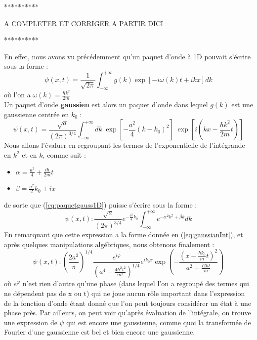 \documentclass{book}
\begin{document}
**********

A COMPLETER ET CORRIGER A PARTIR DICI

**********

En effet, nous avons vu précédemment qu'un paquet d'onde à 1D pouvait s'écrire sous la forme : 
\begin{equation}
  \psi(x,t) = \frac{1}{\sqrt{2 \pi}} \int_{- \infty}^{+ \infty} g(k) \exp \left[ -i\omega(k)t + ikx \right] dk
\end{equation}
où l'on a $\omega(k) = \frac{\hbar k^2}{2m}$ \\
Un paquet d'onde \textbf{gaussien} est alors un paquet d'onde dans lequel $g(k)$ est une gaussienne centrée en $k_0$ :
\begin{equation}
\psi(x, t) = \dfrac{\sqrt{a}}{\left(2\pi\right) ^{3/4}} \int_{-\infty} ^{+\infty} dk \; \exp \left[-\dfrac{a^2}{4} (k-k_0)^2\right] \; \exp\left[i \left(kx - \dfrac{\hbar k^2}{2m}t\right)\right]
\label{eq:paquetgauss1D}
\end{equation}
Nous allons l'évaluer en regroupant les termes de l'exponentielle de l'intégrande en $k^2$ et en $k$, comme suit : 
\begin{itemize}
  \item $\alpha = \frac{a^2}{4} + \frac{i\hbar}{2m}t$
  \item $\beta = \frac{a^2}{2}k_0 + ix$
\end{itemize}
de sorte que (\ref{eq:paquetgauss1D}) puisse s'écrire sous la forme : 
\begin{equation}
  \psi(x,t) : \frac{\sqrt{a}}{(2\pi)^{3/4}} e^{-\frac{a^2}{4}k_0} \int_{- \infty}^{+\infty} e^{-\alpha^2k^2 + \beta k} dk
\end{equation}
En remarquant que cette expression a la forme donnée en (\ref{eq:gaussianInt}), et après quelques manipulations algébriques, nous obtenons finalement : 
\begin{equation}
  \psi(x,t) : \left( \frac{2a^2}{\pi} \right)^{1/4} \frac{e^{i\varphi}}{(a^4 + \frac{4\hbar^2 t^2}{m^2})^{1/4}} e^{ik_0 x} \exp \left( - \frac{(x- \frac{\hbar k_0}{m}t)^2}{a^2 + \frac{i2\hbar t}{m}} \right)
\end{equation}
où $e^{\varphi}$ n'est rien d'autre qu'une phase (dans lequel l'on a regroupé des termes qui ne dépendent pas de x ou t) qui ne joue aucun rôle important dans l'expression de la fonction d'onde étant donné que l'on peut toujours considérer un état à une phase près. 
Par ailleurs, on peut voir qu'après évaluation de l'intégrale, on trouve une expression de $\psi$ qui est encore une gaussienne, comme quoi la transformée de Fourier d'une gaussienne est bel et bien encore une gaussienne. \\
\end{document}
